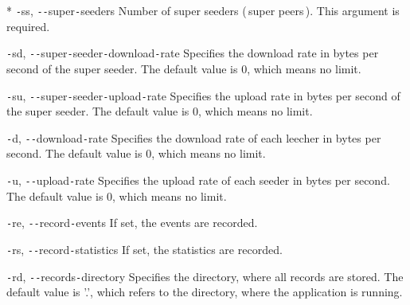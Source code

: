 \begin{flushleft}
* \texttt{-}ss, \texttt{-{}-}super\texttt{-}seeders
\linebreak
Number of super seeders (\,super peers\,). This argument is required.

\texttt{-}sd, \texttt{-{}-}super\texttt{-}seeder\texttt{-}download\texttt{-}rate
\linebreak
Specifies the download rate in bytes per second of the super seeder. The default value is 0, which means no limit.

\texttt{-}su, \texttt{-{}-}super\texttt{-}seeder\texttt{-}upload\texttt{-}rate
\linebreak
Specifies the upload rate in bytes per second of the super seeder. The default value is 0, which means no limit.

\texttt{-}d, \texttt{-{}-}download\texttt{-}rate
\linebreak
Specifies the download rate of each leecher in bytes per second. The default value is 0, which means no limit.

\texttt{-}u, \texttt{-{}-}upload\texttt{-}rate
\linebreak
Specifies the upload rate of each seeder in bytes per second. The default value is 0, which means no limit.



\texttt{-}re, \texttt{-{}-}record\texttt{-}events
\linebreak
If set, the events are recorded.

\texttt{-}rs, \texttt{-{}-}record\texttt{-}statistics
\linebreak
If set, the statistics are recorded.

\texttt{-}rd, \texttt{-{}-}records\texttt{-}directory
\linebreak
Specifies the directory, where all records are stored. The default value is '.', which refers to the directory, where the application is running.
\end{flushleft}